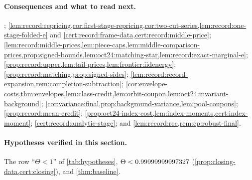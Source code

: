 \paragraph{Consequences and what to read next.}
;
\cref{lem:record:repricing,cor:first-stage-repricing,cor:two-cut-series,lem:record:one-stage-folded-e}
and \cref{cert:record:frame-data,cert:record:middle-price};
\cref{lem:record:middle-prices,lem:piece-caps,lem:middle-comparison-prices,prop:signed-bounds,lem:oct24:matching-star,lem:record:exact-marginal-e};
\cref{prop:record:upper,lem:tail-prices,lem:frontier:iidenergy};
\cref{prop:record:matching,prop:signed-sides};
\cref{lem:record:record-expansion,rem:completion-subtraction};
\cref{cor:envelope-costs,thm:envelopes,lem:class-credit,lem:orbit-coupon,lem:oct24:invariant-background};
\cref{cor:variance:final,prop:background-variance,lem:pool-coupons};
\cref{prop:record:mean-credit};
\cref{prop:oct24-index-cost,lem:index-moments,cert:index-moment};
\cref{cert:record:analytic-stage}; and \cref{lem:record:rec,rem:cp:robust-final}.

\paragraph{Hypotheses verified in this section.}
The row ``$\Theta<1$'' of \cref{tab:hypotheses}, $\Theta<0.99999999997327$
(\cref{prop:closing-data,cert:closing}), and \cref{thm:baseline}.
